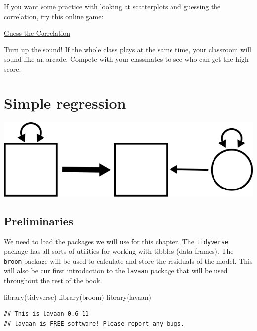 \documentclass[
]{book}
\newenvironment{Shaded}{\begin{snugshade}}{\end{snugshade}}
\newcommand{\FunctionTok}[1]{\textcolor[rgb]{0.00,0.00,0.00}{#1}}
\newcommand{\NormalTok}[1]{#1}
\begin{document}
If you want some practice with looking at scatterplots and guessing the correlation, try this online game:

\href{http://guessthecorrelation.com/}{Guess the Correlation}

Turn up the sound! If the whole class plays at the same time, your classroom will sound like an arcade. Compete with your classmates to see who can get the high score.

\hypertarget{simple}{%
\chapter{Simple regression}\label{simple}}

\begin{center}\includegraphics{graphics/simple_regression} \end{center}

\hypertarget{preliminaries}{%
\section*{Preliminaries}\label{preliminaries}}

We need to load the packages we will use for this chapter. The \texttt{tidyverse} package has all sorts of utilities for working with tibbles (data frames). The \texttt{broom} package will be used to calculate and store the residuals of the model. This will also be our first introduction to the \texttt{lavaan} package that will be used throughout the rest of the book.

\begin{Shaded}
\begin{Highlighting}[]
\FunctionTok{library}\NormalTok{(tidyverse)}
\FunctionTok{library}\NormalTok{(broom)}
\FunctionTok{library}\NormalTok{(lavaan)}
\end{Highlighting}
\end{Shaded}

\begin{verbatim}
## This is lavaan 0.6-11
## lavaan is FREE software! Please report any bugs.
\end{verbatim}
\end{document}
